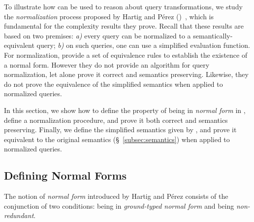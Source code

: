 To illustrate how \gcoql can be used to reason about query transformations, we study the {\em normalization} process proposed by Hartig and Pérez (\HP)~\cite{gqlph}, which is fundamental for the complexity results they prove.
%
Recall that these results are based on two premises: {\em a)} every query can be normalized to a semantically-equivalent query; {\em b)} on such queries, one can use a simplified evaluation function. For normalization,  \HP provide a set of equivalence rules to establish the existence of a normal form. However they do not provide an algorithm for query normalization, let alone prove it correct and semantics preserving. Likewise, they do not prove the equivalence of the simplified semantics when applied to normalized queries.

In this section, we show how to define the property of being in \textit{normal form} in \gcoql, define a normalization procedure, and prove it both correct and semantics preserving. Finally, we define the simplified semantics given by \HP, and prove it equivalent to the original semantics (\S~\ref{subsec:semantics}) when applied to normalized queries.


\subsection{Defining Normal Forms}

The notion of \textit{normal form} introduced by Hartig and Pérez consists of the conjunction of two conditions: being in \textit{ground-typed normal form} and being \textit{non-redundant}.

